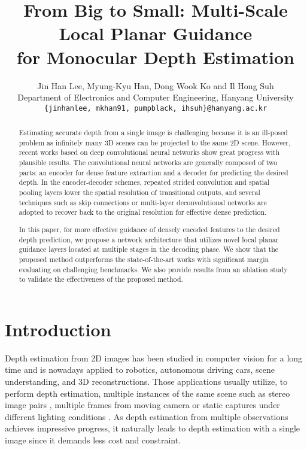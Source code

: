 \documentclass[10pt,twocolumn,letterpaper]{article}
\begin{document}
\title{From Big to Small: Multi-Scale Local Planar Guidance \\ for Monocular Depth Estimation}

\author{Jin Han Lee, Myung-Kyu Han, Dong Wook Ko and Il Hong Suh\\
	Department of Electronics and Computer Engineering, Hanyang University\\
{\tt\small \{jinhanlee, mkhan91, pumpblack, ihsuh\}@hanyang.ac.kr}
}

\maketitle


\begin{abstract}	
Estimating accurate depth from a single image is challenging because it is an ill-posed problem as infinitely many 3D scenes can be projected to the same 2D scene.
However, recent works based on deep convolutional neural networks show great progress with plausible results.
The convolutional neural networks are generally composed of two parts: an encoder for dense feature extraction and a decoder for predicting the desired depth.
In the encoder-decoder schemes, repeated strided convolution and spatial pooling layers lower the spatial resolution of transitional outputs, and several techniques such as skip connections or multi-layer deconvolutional networks are adopted to recover back to the original resolution for effective dense prediction.

In this paper, for more effective guidance of densely encoded features to the desired depth prediction, we propose a network architecture that utilizes novel local planar guidance layers located at multiple stages in the decoding phase.
We show that the proposed method outperforms the state-of-the-art works with significant margin evaluating on challenging benchmarks.
We also provide results from an ablation study to validate the effectiveness of the proposed method.	
\end{abstract}

\section{Introduction}
Depth estimation from 2D images has been studied in computer vision for a long time and is nowadays applied to robotics, autonomous driving cars, scene understanding, and 3D reconstructions.
Those applications usually utilize, to perform depth estimation, multiple instances of the same scene such as stereo image pairs \cite{scharstein2002taxonomy}, multiple frames from moving camera \cite{ranftl2016dense} or static captures under different lighting conditions \cite{abrams2012heliometric,basri2007photometric}.
As depth estimation from multiple observations achieves impressive progress, it naturally leads to depth estimation with a single image since it demands less cost and constraint.
\end{document}
